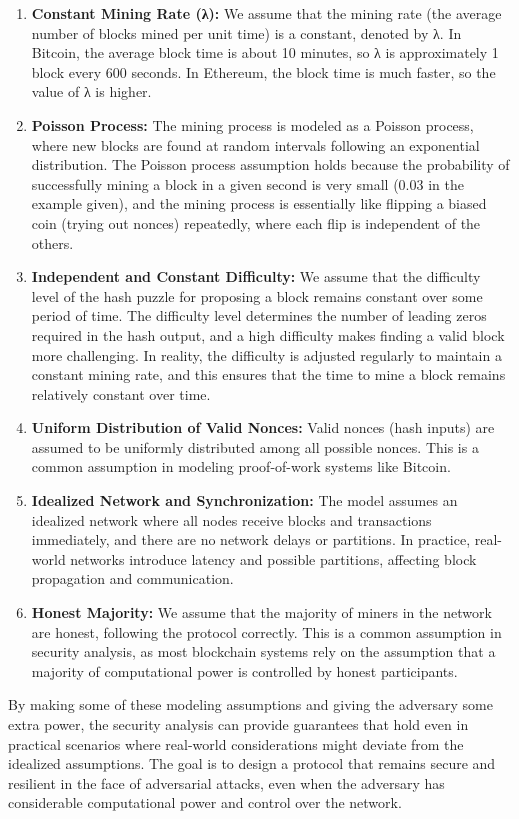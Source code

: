 \documentclass{report}
\begin{document}
\begin{enumerate}
	\item \textbf{Constant Mining Rate (λ):} We assume that the mining rate (the average number of blocks mined per unit time) is a constant, denoted by λ. In Bitcoin, the average block time is about 10 minutes, so λ is approximately 1 block every 600 seconds. In Ethereum, the block time is much faster, so the value of λ is higher.
	\item \textbf{Poisson Process:} The mining process is modeled as a Poisson process, where new blocks are found at random intervals following an exponential distribution. The Poisson process assumption holds because the probability of successfully mining a block in a given second is very small (0.03 in the example given), and the mining process is essentially like flipping a biased coin (trying out nonces) repeatedly, where each flip is independent of the others.
	\item \textbf{Independent and Constant Difficulty:} We assume that the difficulty level of the hash puzzle for proposing a block remains constant over some period of time. The difficulty level determines the number of leading zeros required in the hash output, and a high difficulty makes finding a valid block more challenging. In reality, the difficulty is adjusted regularly to maintain a constant mining rate, and this ensures that the time to mine a block remains relatively constant over time.
	\item \textbf{Uniform Distribution of Valid Nonces:} Valid nonces (hash inputs) are assumed to be uniformly distributed among all possible nonces. This is a common assumption in modeling proof-of-work systems like Bitcoin.
	\item \textbf{Idealized Network and Synchronization:} The model assumes an idealized network where all nodes receive blocks and transactions immediately, and there are no network delays or partitions. In practice, real-world networks introduce latency and possible partitions, affecting block propagation and communication.
	\item \textbf{Honest Majority:}  We assume that the majority of miners in the network are honest, following the protocol correctly. This is a common assumption in security analysis, as most blockchain systems rely on the assumption that a majority of computational power is controlled by honest participants.
\end{enumerate}
By making some of these modeling assumptions and giving the adversary some extra power, the security analysis can provide guarantees that hold even in practical scenarios where real-world considerations might deviate from the idealized assumptions. The goal is to design a protocol that remains secure and resilient in the face of adversarial attacks, even when the adversary has considerable computational power and control over the network.
\end{document}
